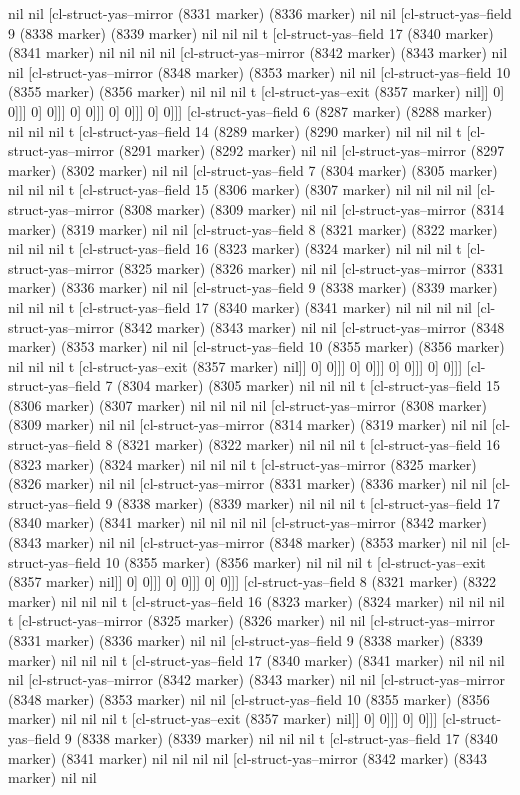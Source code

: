 {{nil nil [cl-struct-yas--mirror (8331 marker) (8336 marker) nil nil [cl-struct-yas--field 9 (8338 marker) (8339 marker) nil nil nil t [cl-struct-yas--field 17 (8340 marker) (8341 marker) nil nil nil nil [cl-struct-yas--mirror (8342 marker) (8343 marker) nil nil [cl-struct-yas--mirror (8348 marker) (8353 marker) nil nil [cl-struct-yas--field 10 (8355 marker) (8356 marker) nil nil nil t [cl-struct-yas--exit (8357 marker) nil]] 0] 0]]] 0] 0]]] 0] 0]]] 0] 0]]] 0] 0]]] [cl-struct-yas--field 6 (8287 marker) (8288 marker) nil nil nil t [cl-struct-yas--field 14 (8289 marker) (8290 marker) nil nil nil t [cl-struct-yas--mirror (8291 marker) (8292 marker) nil nil [cl-struct-yas--mirror (8297 marker) (8302 marker) nil nil [cl-struct-yas--field 7 (8304 marker) (8305 marker) nil nil nil t [cl-struct-yas--field 15 (8306 marker) (8307 marker) nil nil nil nil [cl-struct-yas--mirror (8308 marker) (8309 marker) nil nil [cl-struct-yas--mirror (8314 marker) (8319 marker) nil nil [cl-struct-yas--field 8 (8321 marker) (8322 marker) nil nil nil t [cl-struct-yas--field 16 (8323 marker) (8324 marker) nil nil nil t [cl-struct-yas--mirror (8325 marker) (8326 marker) nil nil [cl-struct-yas--mirror (8331 marker) (8336 marker) nil nil [cl-struct-yas--field 9 (8338 marker) (8339 marker) nil nil nil t [cl-struct-yas--field 17 (8340 marker) (8341 marker) nil nil nil nil [cl-struct-yas--mirror (8342 marker) (8343 marker) nil nil [cl-struct-yas--mirror (8348 marker) (8353 marker) nil nil [cl-struct-yas--field 10 (8355 marker) (8356 marker) nil nil nil t [cl-struct-yas--exit (8357 marker) nil]] 0] 0]]] 0] 0]]] 0] 0]]] 0] 0]]] [cl-struct-yas--field 7 (8304 marker) (8305 marker) nil nil nil t [cl-struct-yas--field 15 (8306 marker) (8307 marker) nil nil nil nil [cl-struct-yas--mirror (8308 marker) (8309 marker) nil nil [cl-struct-yas--mirror (8314 marker) (8319 marker) nil nil [cl-struct-yas--field 8 (8321 marker) (8322 marker) nil nil nil t [cl-struct-yas--field 16 (8323 marker) (8324 marker) nil nil nil t [cl-struct-yas--mirror (8325 marker) (8326 marker) nil nil [cl-struct-yas--mirror (8331 marker) (8336 marker) nil nil [cl-struct-yas--field 9 (8338 marker) (8339 marker) nil nil nil t [cl-struct-yas--field 17 (8340 marker) (8341 marker) nil nil nil nil [cl-struct-yas--mirror (8342 marker) (8343 marker) nil nil [cl-struct-yas--mirror (8348 marker) (8353 marker) nil nil [cl-struct-yas--field 10 (8355 marker) (8356 marker) nil nil nil t [cl-struct-yas--exit (8357 marker) nil]] 0] 0]]] 0] 0]]] 0] 0]]] [cl-struct-yas--field 8 (8321 marker) (8322 marker) nil nil nil t [cl-struct-yas--field 16 (8323 marker) (8324 marker) nil nil nil t [cl-struct-yas--mirror (8325 marker) (8326 marker) nil nil [cl-struct-yas--mirror (8331 marker) (8336 marker) nil nil [cl-struct-yas--field 9 (8338 marker) (8339 marker) nil nil nil t [cl-struct-yas--field 17 (8340 marker) (8341 marker) nil nil nil nil [cl-struct-yas--mirror (8342 marker) (8343 marker) nil nil [cl-struct-yas--mirror (8348 marker) (8353 marker) nil nil [cl-struct-yas--field 10 (8355 marker) (8356 marker) nil nil nil t [cl-struct-yas--exit (8357 marker) nil]] 0] 0]]] 0] 0]]] [cl-struct-yas--field 9 (8338 marker) (8339 marker) nil nil nil t [cl-struct-yas--field 17 (8340 marker) (8341 marker) nil nil nil nil [cl-struct-yas--mirror (8342 marker) (8343 marker) nil nil }}
